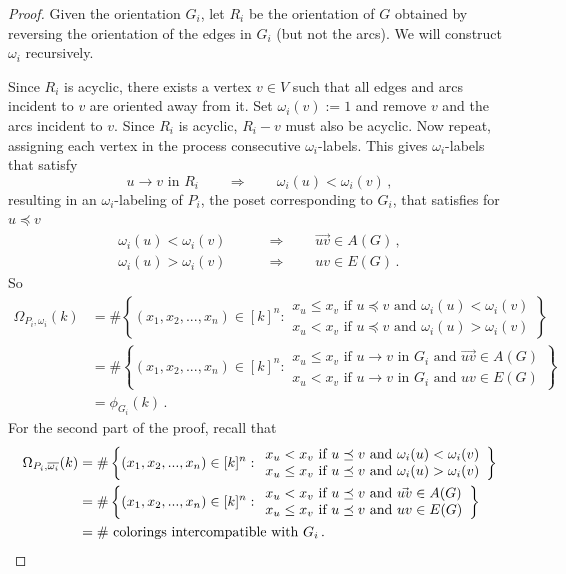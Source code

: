 \documentclass[11pt]{amsart}
\begin{document}
\begin{proof}
Given the orientation $G_i$, let $R_i$ be the orientation of $G$ obtained by reversing the orientation of the edges in $G_i$ (but not the arcs). 
We will construct $\omega_i$ recursively.

Since $R_i$ is acyclic, there exists a vertex $v \in V$ such that all edges and arcs incident to $v$ are oriented away from it. 
Set $\omega_i(v) := 1$ and remove $v$ and the arcs incident to $v$.  Since $R_i$ is acyclic, $R_i-v$ must also be acyclic.  
Now repeat, assigning each vertex in the process consecutive $\omega_i$-labels.
This gives $\omega_i$-labels that satisfy
\[
  u \to v \text{ in } R_i
  \qquad \Longrightarrow \qquad
  \omega_i(u) < \omega_i(v) \, ,
\] 
resulting in an $\omega_i$-labeling of $P_i$, the poset corresponding to $G_i$, that satisfies for $u \preceq v$ 
\begin{align*}
  \omega_i(u) < \omega_i(v) \qquad &\Longrightarrow \qquad \vec{uv} \in A(G) \, , \\
  \omega_i(u) > \omega_i(v) \qquad &\Longrightarrow \qquad uv \in E(G) \, .
\end{align*}
So
\begin{align*}
  \Omega_{P_i,\omega_i}(k)
  &= \# \left\{ (x_1, x_2, ... , x_n) \in [k]^n : 
  \begin{array}{l}
    x_u \le x_v \text{ if } u \preceq v \text{ and } \omega_i (u) < \omega_i (v) \\
    x_u < x_v \text{ if } u \preceq v \text{ and } \omega_i (u) > \omega_i (v) 
  \end{array} \right\} \\
  &= \# \left\{ (x_1, x_2, ... , x_n) \in [k]^n : 
  \begin{array}{l}
    x_u \le x_v \text{ if } u \to v \text{ in } G_i \text{ and } \vec{uv} \in A(G) \\
    x_u < x_v \text{ if } u \to v \text{ in } G_i \text{ and } uv \in E(G)
  \end{array} \right\} \\ 
  &= \phi_{G_i}(k) \, .
\end{align*}
%
For the second part of the proof, recall that
\begin{align*}
  \Omega _{P_i,\overline{\omega_i}} (k)
  &= \# \left\{ (x_1, x_2, ... , x_n) \in [k]^n : 
  \begin{array}{l}
    x_u < x_v \text{ if } u \preceq v \text{ and } \omega_i (u) < \omega_i (v) \\
    x_u \le x_v \text{ if } u \preceq v \text{ and } \omega_i (u) > \omega_i (v) 
  \end{array} \right\} \\
  &= \# \left\{ (x_1, x_2, ... , x_n) \in [k]^n : 
  \begin{array}{l}
    x_u < x_v \text{ if } u \preceq v \text{ and } \vec{uv} \in A(G) \\
    x_u \le x_v \text{ if } u \preceq v \text{ and } uv \in E(G)
  \end{array} \right\} \\
  &= \# \text{ colorings intercompatible with } G_i \, . \qedhere
\end{align*}
\end{proof}
\end{document}
